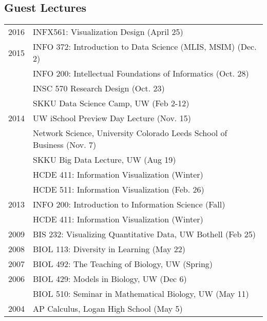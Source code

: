 \documentclass[11pt]{article}
\begin{document}
\subsection*{Guest Lectures}
\begin{longtable}{p{0.5in}|p{5.5in}}
  2016 & INFX561:  Visualization Design (April 25) \\
  2015 	& INFO 372:  Introduction to Data Science (MLIS, MSIM) (Dec. 2) \\
  		& INFO 200:  Intellectual Foundations of Informatics (Oct. 28) \\
  		& INSC 570 Research Design (Oct. 23) \\
      & SKKU Data Science Camp, UW (Feb 2-12) \\
  2014 & UW iSchool Preview Day Lecture (Nov. 15) \\
       & Network Science, University Colorado Leeds School of Business (Nov. 7) \\
        & SKKU Big Data Lecture, UW (Aug 19) \\
        & HCDE 411:  Information Visualization (Winter) \\
        & HCDE 511:  Information Visualization (Feb. 26) \\
  2013	& INFO 200:  Introduction to Information Science (Fall) \\
        & HCDE 411:  Information Visualization (Winter) \\
  2009  & BIS 232:  Visualizing Quantitative Data, UW Bothell (Feb 25) \\
  2008  & BIOL 113:  Diversity in Learning (May 22) \\
  2007  & BIOL 492:  The Teaching of Biology, UW (Spring) \\
  2006  & BIOL 429:  Models in Biology, UW (Dec 6) \\
        & BIOL 510:  Seminar in Mathematical Biology, UW (May 11) \\
  2004  & AP Calculus, Logan High School (May 5) \\     

\end{longtable}


\end{document}
